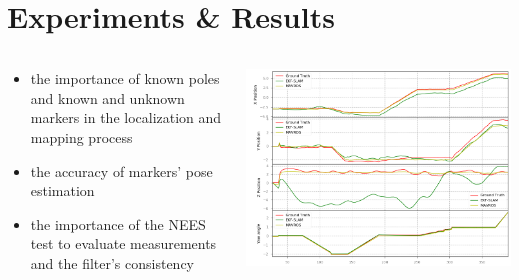 \documentclass[serif,aspectratio=169]{beamer}
\begin{document}
    \section{Experiments \& Results}

    \begin{frame}
        \begin{columns}[c]
            \begin{column}{.4\textwidth}
                \begin{itemize}
                    \item{the importance of known poles and known and unknown markers in the localization and mapping process}
                    \item{the accuracy of markers' pose estimation}
                    \item{the importance of the NEES test to evaluate measurements and the filter's consistency}
                \end{itemize}
            \end{column}
            \begin{column}{.6\textwidth}
                \centering
                \includegraphics[height=0.8\textheight]{Images/fig19-odom_only.png}
            \end{column}
        \end{columns}

    \end{frame}
\end{document}
